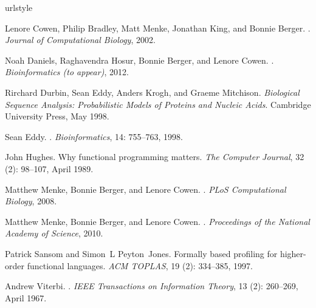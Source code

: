 \documentclass[preprint,nonatbib,blockstyle,times]{sigplanconf}
\begin{document}
\iffalse

\else
\begin{thebibliography}{9}
\providecommand{\natexlab}[1]{#1}
\providecommand{\url}[1]{\texttt{#1}}
\expandafter\ifx\csname urlstyle\endcsname\relax
  \providecommand{\doi}[1]{doi: #1}\else
  \providecommand{\doi}{doi: \begingroup \urlstyle{rm}\Url}\fi

Lenore Cowen, Philip Bradley, Matt Menke, Jonathan King, and Bonnie Berger.
.
\newblock \emph{Journal of Computational Biology}, 2002.

Noah Daniels, Raghavendra Hosur, Bonnie Berger, and Lenore Cowen.
.
\newblock \emph{Bioinformatics (to appear)}, 2012.

Rirchard Durbin, Sean Eddy, Anders Krogh, and Graeme Mitchison.
\newblock \emph{{Biological Sequence Analysis: Probabilistic Models of Proteins
  and Nucleic Acids}}.
\newblock Cambridge University Press, May 1998.

Sean Eddy.
.
\newblock \emph{Bioinformatics}, 14: 755--763, 1998.

John Hughes.
\newblock Why functional programming matters.
\newblock \emph{The Computer Journal}, 32 (2): 98--107, April
  1989.

Matthew Menke, Bonnie Berger, and Lenore Cowen.
.
\newblock \emph{PLoS Computational Biology}, 2008.

Matthew Menke, Bonnie Berger, and Lenore Cowen.
.
\newblock \emph{Proceedings of the National Academy of Science}, 2010.

Patrick Sansom and Simon~L Peyton~Jones.
\newblock Formally based profiling for higher-order functional languages.
\newblock \emph{ACM TOPLAS}, 19 (2): 334--385, 1997.

Andrew Viterbi.
.
\newblock \emph{IEEE Transactions on Information Theory}, 13
  (2): 260--269, April 1967.

\end{thebibliography}
\fi
\end{document}
